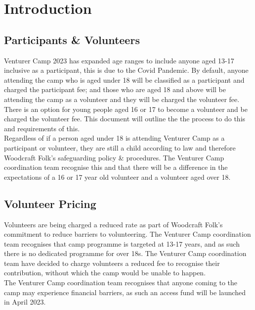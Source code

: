 \documentclass[a4paper, 11pt]{article}
\begin{document}
\section{Introduction}
\subsection{Participants \& Volunteers}
Venturer Camp 2023 has expanded age ranges to include anyone aged 13-17 inclusive as a participant, this is due to the Covid Pandemic. By default, anyone attending the camp who is aged under 18 will be classified as a participant and charged the participant fee; and those who are aged 18 and above will be attending the camp as a volunteer and they will be charged the volunteer fee.\\

There is an option for young people aged 16 or 17 to become a volunteer and be charged the volunteer fee. This document will outline the the process to do this and requirements of this.\\

Regardless of if a person aged under 18 is attending Venturer Camp as a participant or volunteer, they are still a child according to law and therefore Woodcraft Folk's safeguarding policy \& procedures. The Venturer Camp coordination team recognise this and that there will be a difference in the expectations of a 16 or 17 year old volunteer and a volunteer aged over 18. 

\subsection{Volunteer Pricing}
Volunteers are being charged a reduced rate as part of Woodcraft Folk's commitment to reduce barriers to volunteering. The Venturer Camp coordination team recognises that camp programme is targeted at 13-17 years, and as such there is no dedicated programme for over 18s. The Venturer Camp coordination team have decided to charge volunteers a reduced fee to recognise their contribution, without which the camp would be unable to happen.\\

The Venturer Camp coordination team recognises that anyone coming to the camp may experience financial barriers, as such an access fund will be launched in April 2023. 
\end{document}
